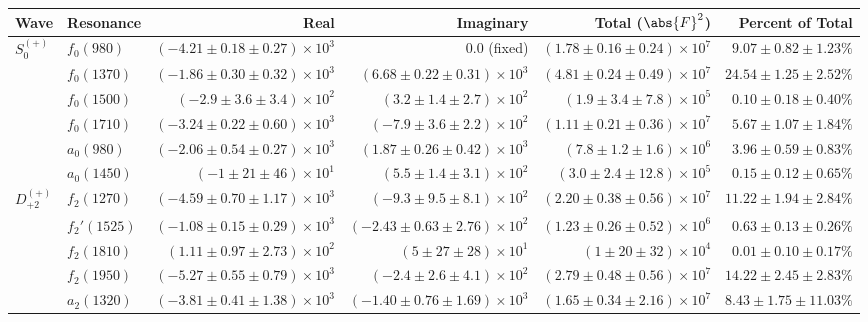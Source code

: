 \begin{table}[ht]
    \begin{center}
        \begin{tabular}{llrrrr}\toprule
        Wave & Resonance & Real & Imaginary & Total ($\abs{F}^2$) & Percent of Total \\\midrule
$S_{0}^{(+)}$ & $f_{0}(980)$ & $(-4.21 \pm 0.18 \pm 0.27) \times 10^{3}$ & $0.0$ (fixed) & $(1.78 \pm 0.16 \pm 0.24) \times 10^{7}$ & $9.07 \pm 0.82 \pm 1.23 \%$ \\
 & $f_{0}(1370)$ & $(-1.86 \pm 0.30 \pm 0.32) \times 10^{3}$ & $(6.68 \pm 0.22 \pm 0.31) \times 10^{3}$ & $(4.81 \pm 0.24 \pm 0.49) \times 10^{7}$ & $24.54 \pm 1.25 \pm 2.52 \%$ \\
 & $f_{0}(1500)$ & $(-2.9 \pm 3.6 \pm 3.4) \times 10^{2}$ & $(3.2 \pm 1.4 \pm 2.7) \times 10^{2}$ & $(1.9 \pm 3.4 \pm 7.8) \times 10^{5}$ & $0.10 \pm 0.18 \pm 0.40 \%$ \\
 & $f_{0}(1710)$ & $(-3.24 \pm 0.22 \pm 0.60) \times 10^{3}$ & $(-7.9 \pm 3.6 \pm 2.2) \times 10^{2}$ & $(1.11 \pm 0.21 \pm 0.36) \times 10^{7}$ & $5.67 \pm 1.07 \pm 1.84 \%$ \\
 & $a_{0}(980)$ & $(-2.06 \pm 0.54 \pm 0.27) \times 10^{3}$ & $(1.87 \pm 0.26 \pm 0.42) \times 10^{3}$ & $(7.8 \pm 1.2 \pm 1.6) \times 10^{6}$ & $3.96 \pm 0.59 \pm 0.83 \%$ \\
 & $a_{0}(1450)$ & $(-1 \pm 21 \pm 46) \times 10^{1}$ & $(5.5 \pm 1.4 \pm 3.1) \times 10^{2}$ & $(3.0 \pm 2.4 \pm 12.8) \times 10^{5}$ & $0.15 \pm 0.12 \pm 0.65 \%$ \\
$D_{+2}^{(+)}$ & $f_{2}(1270)$ & $(-4.59 \pm 0.70 \pm 1.17) \times 10^{3}$ & $(-9.3 \pm 9.5 \pm 8.1) \times 10^{2}$ & $(2.20 \pm 0.38 \pm 0.56) \times 10^{7}$ & $11.22 \pm 1.94 \pm 2.84 \%$ \\
 & $f_{2}'(1525)$ & $(-1.08 \pm 0.15 \pm 0.29) \times 10^{3}$ & $(-2.43 \pm 0.63 \pm 2.76) \times 10^{2}$ & $(1.23 \pm 0.26 \pm 0.52) \times 10^{6}$ & $0.63 \pm 0.13 \pm 0.26 \%$ \\
 & $f_{2}(1810)$ & $(1.11 \pm 0.97 \pm 2.73) \times 10^{2}$ & $(5 \pm 27 \pm 28) \times 10^{1}$ & $(1 \pm 20 \pm 32) \times 10^{4}$ & $0.01 \pm 0.10 \pm 0.17 \%$ \\
 & $f_{2}(1950)$ & $(-5.27 \pm 0.55 \pm 0.79) \times 10^{3}$ & $(-2.4 \pm 2.6 \pm 4.1) \times 10^{2}$ & $(2.79 \pm 0.48 \pm 0.56) \times 10^{7}$ & $14.22 \pm 2.45 \pm 2.83 \%$ \\
 & $a_{2}(1320)$ & $(-3.81 \pm 0.41 \pm 1.38) \times 10^{3}$ & $(-1.40 \pm 0.76 \pm 1.69) \times 10^{3}$ & $(1.65 \pm 0.34 \pm 2.16) \times 10^{7}$ & $8.43 \pm 1.75 \pm 11.03 \%$ \\

\end{tabular}
\end{center}
\end{table}
